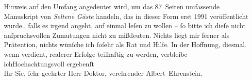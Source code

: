 \begin{ledgroupsized}[t]{13cm}
{{{                        Hinweis auf den Umfang angedeutet wird, um das 87 Seiten umfassende
                        Manuskript von \emph{Seltene Gäste} handeln, das
                        in dieser Form erst 1991 veröffentlicht wurde.}}}\label{K_L01792_2h}, falls es
                    irgend angeht, auf einmal leſen zu wollen – ſo bitte ich dieſe nicht
                    anſpruchsvollen Zumutungen nicht zu mißdeuten. Nichts liegt mir ferner als
                    Prätention, nichts wünſche ich ſoſehr als Rat und Hilfe. In der Hoffnung,
                    diesmal, wenn verdient, realerer Erfolge teilhaftig zu werden, verbleibe
                        ich\hspace*{1.5em}Hochachtungsvoll ergebenſt{\\}Ihr Sie,
                    ſehr geehrter Herr Doktor, verehrender\pend
           \pstart \spacefill\mbox{Albert Ehrenstein.}\pend{}
         
         \endnumbering{}\end{ledgroupsized}  \newcommand{\dateiname}{L01792}\newcommand{\titel}{Albert Ehrenstein an Arthur Schnitzler, 10. 10. 1908}\newcommand{\editorInnen}{Martin Anton Müller und Gerd-Hermann Susen}
      
